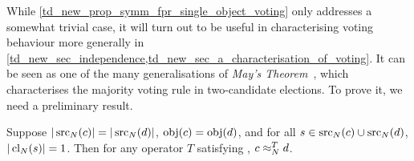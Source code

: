 While \cref{td_new_prop_symm_fpr_single_object_voting} only addresses a
somewhat trivial case, it will turn out to be useful in characterising voting
behaviour more generally in
\cref{td_new_sec_independence,td_new_sec_a_characterisation_of_voting}. It can
be seen as one of the many generalisations of \emph{May's
Theorem}~\cite{may1952set}, which characterises the majority voting rule in
two-candidate elections.
%
To prove it, we need a preliminary result.

\begin{lemma}
    \label{td_new_lemma_symm_equal_sources_one_claim}
    Suppose $|\operatorname{src}_N(c)| = |\operatorname{src}_N(d)|$, $\operatorname{obj}(c) = \operatorname{obj}(d)$, and for all $s
    \in \operatorname{src}_N(c) \cup \operatorname{src}_N(d)$, $|\operatorname{cl}_N(s)| = 1$. Then for any operator
    $T$ satisfying \symmetry{}, $c \approx_N^T d$.
\end{lemma}

